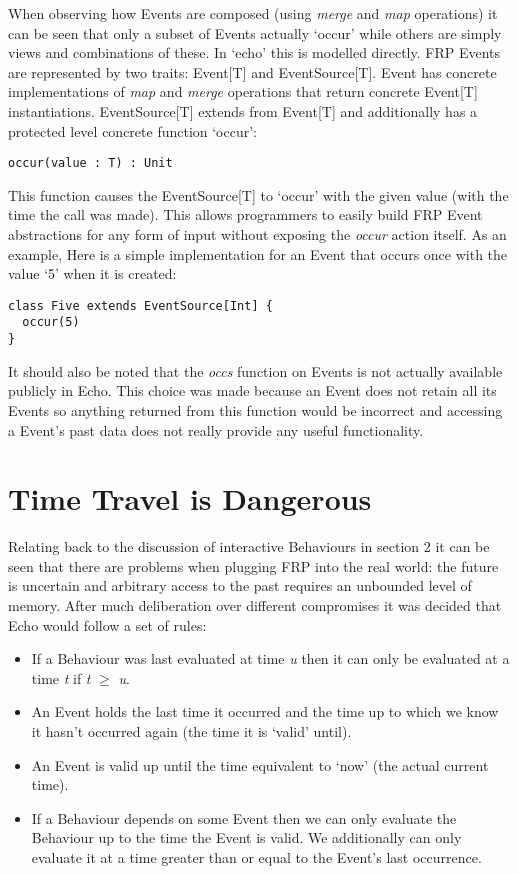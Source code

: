     When observing how Events are composed (using \emph{merge} and \emph{map} operations) it can be seen that
    only a subset of Events actually `occur' while others are simply views and combinations of these.
    In `echo' this is modelled directly. FRP Events are represented by two traits: Event[T] and EventSource[T].
    Event has concrete implementations of \emph{map} and \emph{merge} operations that
    return concrete Event[T] instantiations. EventSource[T] extends
    from Event[T] and additionally has a protected level concrete function `occur':
    
\begin{verbatim}
occur(value : T) : Unit
\end{verbatim}  

    This function causes the EventSource[T] to `occur' with the given value (with the time the call was made). This allows 
    programmers
    to easily build FRP Event abstractions for any form of input without exposing the \emph{occur} action itself.
    As an example, Here is a simple implementation for an Event that occurs once with the value `5' when it 
    is created:
    
\begin{verbatim}
class Five extends EventSource[Int] {
  occur(5)
}
\end{verbatim}

    It should also be noted that the \emph{occs} function on Events is not actually available publicly in Echo. This
    choice was made because an Event does not retain all its Events so anything returned from this 
    function would be incorrect and accessing a Event's past data does not really
    provide any useful functionality.   

  \section{Time Travel is Dangerous}
    Relating back to the discussion of interactive Behaviours in section 2 it can be seen
    that there are problems when plugging FRP into the real world: the future is uncertain and
    arbitrary access to the past requires an unbounded level of memory. After much deliberation
    over different compromises it was decided that Echo would follow a set of rules:
    
    \begin{itemize}
      \item If a Behaviour was last evaluated at time \emph{u} then it can only be evaluated at
      a time \emph{t} if \emph{t} $\geq$ \emph{u}.
      \item An Event holds the last time it occurred and the time up to which we know it hasn't occurred
      again (the time it is `valid' until).
      \item An Event is valid up until the time equivalent to `now' (the actual current time).
      \item If a Behaviour depends on some Event then we can only evaluate the Behaviour up to
      the time the Event is valid. We additionally can only evaluate it at a time greater than
      or equal to the Event's last occurrence.
    \end{itemize}
    
